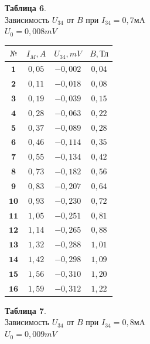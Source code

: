 \documentclass[11pt,a4paper]{article}
\begin{document}
\begin{paracol}{2}
\begin{table}[t!] 
	\begin{center} 
		\textbf{Таблица 6}. \\ Зависимость $U_{34}$ от $B$ при $I_{34} = 0,7 \text{мA}$\\ 
		$U_0 = 0,008 mV$
		\\
		\begin{tabular}{|c|c|c|c|} 
			\hline 
			$\text{№}$ & $I_M,A$ & $U_{34},mV$ & $B,\text{Тл}$ \\ \hline 
			$\textbf{1}$ & $0,05$ & $-0,002$ & $0,04$ \\ \hline 
			$\textbf{2}$ & $0,11$ & $-0,018$ & $0,08$ \\ \hline 
			$\textbf{3}$ & $0,19$ & $-0,039$ & $0,15$ \\ \hline 
			$\textbf{4}$ & $0,28$ & $-0,063$ & $0,22$ \\ \hline 
			$\textbf{5}$ & $0,37$ & $-0,089$ & $0,28$ \\ \hline 
			$\textbf{6}$ & $0,46$ & $-0,114$ & $0,35$ \\ \hline 
			$\textbf{7}$ & $0,55$ & $-0,134$ & $0,42$ \\ \hline 
			$\textbf{8}$ & $0,73$ & $-0,182$ & $0,56$ \\ \hline 
			$\textbf{9}$ & $0,83$ & $-0,207$ & $0,64$ \\ \hline 
			$\textbf{10}$ & $0,93$ & $-0,230$ & $0,72$ \\ \hline 
			$\textbf{11}$ & $1,05$ & $-0,251$ & $0,81$ \\ \hline 
			$\textbf{12}$ & $1,14$ & $-0,265$ & $0,88$ \\ \hline 
			$\textbf{13}$ & $1,32$ & $-0,288$ & $1,01$ \\ \hline 
			$\textbf{14}$ & $1,42$ & $-0,298$ & $1,09$ \\ \hline 
			$\textbf{15}$ & $1,56$ & $-0,310$ & $1,20$ \\ \hline 
			$\textbf{16}$ & $1,59$ & $-0,312$ & $1,22$ \\ \hline 
		\end{tabular} 
	\end{center} 
\end{table}
\switchcolumn
\begin{table}[h!] 
	\begin{center} 
		\textbf{Таблица 7}. \\ Зависимость $U_{34}$ от $B$ при $I_{34} = 0,8 \text{мA}$\\ 
		$U_0 = 0,009 mV$

\end{center}
\end{table}
\end{paracol}
\end{document}
